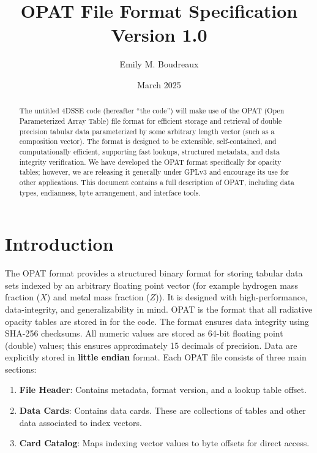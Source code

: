 \documentclass{article}
\title{\textbf{OPAT File Format Specification}\\Version 1.0}
\author{Emily M. Boudreaux}
\date{March 2025}
\begin{document}
\maketitle

\begin{abstract}
The untitled 4DSSE code (hereafter ``the code'') will make use of the OPAT (Open
  Parameterized Array Table) file format for efficient storage and retrieval of
  double precision tabular data parameterized by some arbitrary length vector
  (such as a composition vector). The format is designed to be extensible,
  self-contained, and computationally efficient, supporting fast lookups,
  structured metadata, and data integrity verification. We have developed the
  OPAT format specifically for opacity tables; however, we are releasing it
  generally under GPLv3 and encourage its use  for other applications. This
  document contains a full description of OPAT, including data types,
  endianness, byte arrangement, and interface tools. 
\end{abstract}

\newpage

\section{Introduction}
The OPAT format provides a structured binary format for storing tabular data
sets indexed by an arbitrary floating point vector (for example hydrogen mass
fraction ($X$) and metal mass fraction ($Z$)).  It is designed with
high-performance, data-integrity, and generalizability in mind.  OPAT is the
format that all radiative opacity tables are stored in for the code.  The format
ensures data integrity using SHA-256 checksums.  All numeric values are stored
as 64-bit floating point (double) values;  this ensures approximately 15
decimals of precision.  Data are explicitly stored in \textbf{little endian}
format. 
\noindent Each OPAT file consists of three main sections:
\begin{enumerate}
    \item \textbf{File Header}: Contains metadata, format version, and a lookup table offset. 
    \item \textbf{Data Cards}: Contains data cards. These are collections of tables and other data associated to index vectors. 
    \item \textbf{Card Catalog}: Maps indexing vector values to byte offsets for direct access. 
\end{enumerate}
\end{document}
